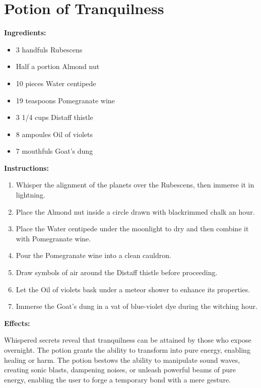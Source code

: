 \documentclass{article}
\begin{document}
\newpage
\section*{Potion of Tranquilness}

\textbf{Ingredients:}

\begin{itemize}
  \item 3 handfuls Rubescens
  \item Half a portion Almond nut
  \item 10 pieces Water centipede
  \item 19 teaspoons Pomegranate wine
  \item 3 1/4 cups Distaff thistle
  \item 8 ampoules Oil of violets
  \item 7 mouthfuls Goat's dung
\end{itemize}

\textbf{Instructions:}

\begin{enumerate}
  \item Whisper the alignment of the planets over the Rubescens, then immerse it in lightning.
  \item Place the Almond nut inside a circle drawn with blackrimmed chalk an hour.
  \item Place the Water centipede under the moonlight to dry and then combine it with Pomegranate wine.
  \item Pour the Pomegranate wine into a clean cauldron.
  \item Draw symbols of air around the Distaff thistle before proceeding.
  \item Let the Oil of violets bask under a meteor shower to enhance its properties.
  \item Immerse the Goat's dung in a vat of blue-violet dye during the witching hour.
\end{enumerate}

\textbf{Effects:}

Whispered secrets reveal that tranquilness can be attained by those who expose overnight. The potion grants the ability to transform into pure energy, enabling healing or harm. The potion bestows the ability to manipulate sound waves, creating sonic blasts, dampening noises, or unleash powerful beams of pure energy, enabling the user to forge a temporary bond with a mere gesture.

\newpage
\end{document}
